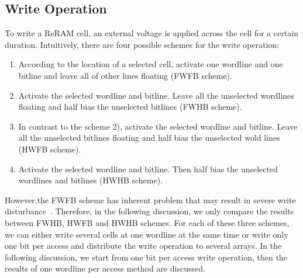\subsection{Write Operation}
To write a ReRAM cell, an external voltage is applied across the cell for
a certain duration. Intuitively, there are four possible schemes for the
write operation:
\begin{enumerate}
  \item According to the location of a selected cell, activate one
      wordline and one bitline and leave all of other lines floating
      (FWFB scheme).
  \item Activate the selected wordline and bitline. Leave all the
      unselected wordlines floating and half bias the unselected
      bitlines (FWHB scheme).
  \item In contrast to the scheme 2), activate the selected wordline
      and bitline. Leave all the unselected bitlines floating and half
      bias the unselected wold lines (HWFB scheme).
  \item Activate the selected wordline and bitline. Then half bias the
      unselected wordlines and bitlines (HWHB scheme).
\end{enumerate}
However,the FWFB scheme has inherent problem that may result in severe
write disturbance~\cite{crossbar_NANO2003_Ziegler}. Therefore, in the
following discussion, we only compare the results between FWHB, HWFB and
HWHB schemes. For each of these three schemes, we can either write several
cells at one wordline at the same time or write only one bit per access
and distribute the write operation to several arrays. In the following
discussion, we start from one bit per access write operation, then the
results of one wordline per access method are discussed.

